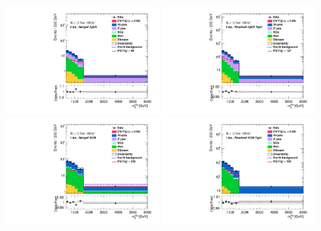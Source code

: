 \begin{figure}[]
    \centering
    \includegraphics[width=0.45\textwidth]{figures/PostFit/Region_distMTagJets_DCRVjetMer_BMin0_J0_incJet1_L0_T0_incFat1_Y6051_incTag1_Fat1_GlobalFit_unconditionnal_mu1log}
    \includegraphics[width=0.45\textwidth]{figures/PostFit/Region_distMTagJets_DCRVjetFid_BMin0_T0_Y6051_incTag1_J2_L0_incJet1_GlobalFit_unconditionnal_mu1log}
    \\
    \includegraphics[width=0.45\textwidth]{figures/PostFit/Region_disttagMjj_DCRVjetMerged_BMin0_J0_incJet1_L1_T0_incFat1_Y6051_incTag1_Fat1_GlobalFit_unconditionnal_mu1log}
    \includegraphics[width=0.45\textwidth]{figures/PostFit/Region_disttagMjj_DCRVjetTight_BMin0_T0_Y6051_incTag1_J2_L1_incJet1_GlobalFit_unconditionnal_mu1log}
    \\

\end{figure}

